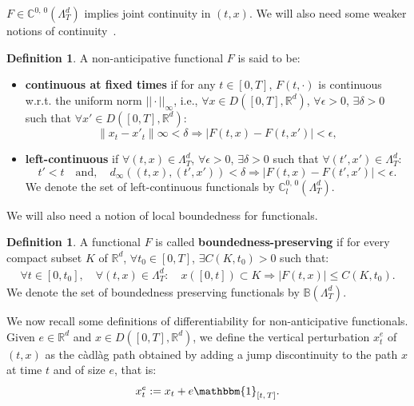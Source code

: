 \documentclass[10pt]{amsart}
\theoremstyle{definition}\newtheorem{defi}[theo]{Definition}\newtheorem{rema}[theo]{Remark}\newtheorem{exam}[theo]{Example}\newtheorem{exem}[theo]{Example}\newtheorem{nota}[theo]{Notation}
\newcommand{\cadlag}{càdlàg }
\newcommand{\bbC}{\mathbb{C}}
\newcommand{\bbB}{\mathbb{B}}
\newcommand{\bbmun}{\mathbbm{1}}
\newcommand{\Rr}{{\mathbb{R}}}
\let\oldexists\exists
\renewcommand*{\exists}{\mathrel{\oldexists}}
\let\oldforall\forall
\renewcommand*{\forall}{\mathrel{\oldforall}}
\begin{document}
$F\in \bbC^{0,\,0}(\Lambda_T^d)$ implies joint continuity in $(t,{x})$. We will also need some weaker notions of continuity~\cite{cont2012}.
\begin{defi}
A non-anticipative functional $F$ is said to be:
\begin{itemize}
\item \textbf{continuous at fixed times} if for any $t \in [0, T]$, $F(t, \cdot)$ is continuous w.r.t. the uniform norm $||\cdot||_\infty$, i.e., $\forall {x} \in D([0, T], \Rr^d)$, $\forall \epsilon > 0 $, $\exists \delta > 0$ such that $\forall {x}' \in D([0, T], \Rr^d)$:
\[
\left\|{x}_t- {x}'_t\right\|\infty < \delta \Rightarrow \left|F(t, {x}) - F\left(t, {x}'\right)\right| < \epsilon,
\]
\item \textbf{left-continuous} if $\forall (t, {x}) \in \Lambda_T^d$, $\forall \epsilon > 0$, $\exists \delta > 0$ such that $\forall (t', {x}') \in \Lambda_T^d$:
\[
t' < t \quad \text{and}, \quad d_\infty\left((t, {x}), \left(t', {x}'\right)\right) < \delta \Rightarrow \left|F(t, {x}) - F\left(t', {x}'\right)\right| < \epsilon.
\]
We denote the set of left-continuous functionals by $\bbC^{0,\,0}_l(\Lambda_T^d)$.
\end{itemize}
\end{defi}

We will also need a notion of local boundedness for functionals.
\begin{defi}
A functional $F$ is called \textbf{boundedness-preserving} if for every compact subset $K$ of $\Rr^d$, $\forall t_0 \in [0, T]$, $\exists C(K, t_0) > 0$ such that:
\begin{align*}
\forall t \in \left[0, t_0\right],\quad \forall (t, {x}) \in \Lambda_T^d: \quad {x}([0, t]) \subset K \Rightarrow \left|F(t, {x})\right|\leq C\left(K, t_0\right).
\end{align*}
We denote the set of boundedness preserving functionals by $\bbB(\Lambda_T^d)$.
\end{defi}

We now recall some definitions of differentiability for non-anticipative functionals. Given $e \in \Rr^d$ and ${x} \in D([0, T], \Rr^d)$, we define the vertical perturbation ${x}_t^e$ of $(t, {x})$ as the \cadlag path obtained by adding a jump discontinuity to the path ${x}$ at time $t$ and of size $e$, that is:
\[
{x}_t^e := {x}_t + e\bbmun_{[t,\,T]}.
\]
\end{document}
